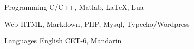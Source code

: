 

\begin{cvskills}

  \cvskill
    {Programming} %
    {C/C++, Matlab, LaTeX, Lua} %

  \cvskill
    {Web} %
    {HTML, Markdown, PHP, Mysql, Typecho/Wordpress} %

  \cvskill
    {Languages} %
    {English CET-6, Mandarin} %

\end{cvskills}
